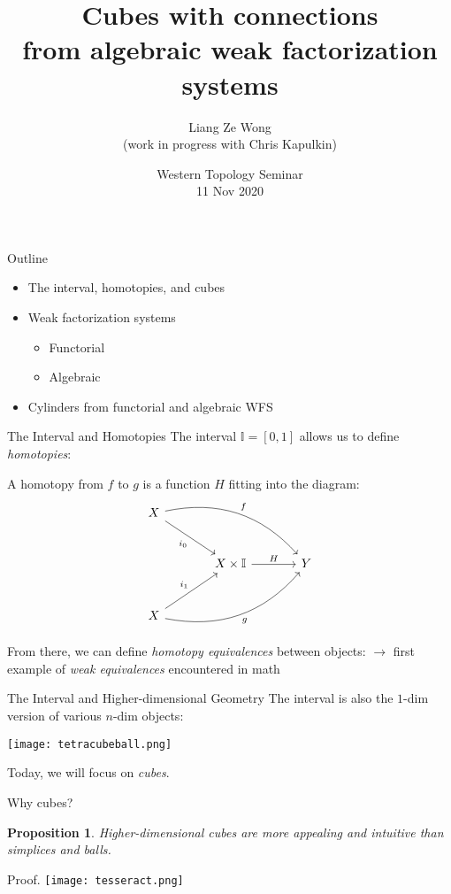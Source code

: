 \documentclass[compress]{beamer}
\title{Cubes with connections \\ from algebraic weak factorization systems}
\author{Liang Ze Wong \\ (work in progress with Chris Kapulkin)}
\date{Western Topology Seminar\\ 11 Nov 2020}
\newtheorem{proposition}[theorem]{Proposition}
\newcommand{\I}{\mathbb{I}}
\newcommand{\1}{\mathbf{1}}
\begin{document}
 
\frame{\titlepage}

\begin{frame}{Outline}
	\begin{itemize}  \setlength{\itemsep}{15pt}
		\item The interval, homotopies, and cubes
		\item Weak factorization systems
			\begin{itemize}
				\item Functorial
				\item Algebraic
			\end{itemize}
		\item Cylinders from functorial and algebraic WFS
	\end{itemize}
\end{frame}

\begin{frame}[fragile]{The Interval and Homotopies}
	The interval $\I = [0,1]$ allows us to define \emph{homotopies}: 
	\pause \vfill
	\begin{block}{}
	A homotopy from $f$ to $g$ is a function $H$ fitting into the diagram:
	\[
		\begin{tikzcd}[sep = large]
			X \ar[dr, "i_0"'] \ar[drr, bend left, "f"] & &
			\\
			& X \times \I \ar[r, "H"] & Y
			\\
			X \ar[ur, "i_1"] \ar[urr, bend right, "g"'] & &
		\end{tikzcd}
	\]
	\end{block}
	\pause
	From there, we can define \emph{homotopy equivalences} between objects:
	\pause
	\vfill
	$\to$ first example of \emph{weak equivalences} encountered in math
\end{frame}

\begin{frame}[fragile]{The Interval and Higher-dimensional Geometry}
	The interval is also the $1$-dim version of various $n$-dim objects:
	\pause \vfill
	\begin{centering}
		  \texttt{[image: tetracubeball.png]}
	\end{centering}
	\pause \vfill
	Today, we will focus on \emph{cubes}.
\end{frame}

\begin{frame}{Why cubes?}
	\begin{proposition}
		Higher-dimensional cubes are more appealing and intuitive than simplices and balls.
	\end{proposition}
	\pause
	\begin{block}{Proof.}
	\centering
		  \texttt{[image: tesseract.png]}
	\end{block}
\end{frame}
\end{document}
